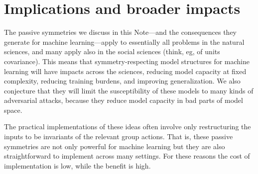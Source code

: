 \documentclass[11pt]{article}
\renewcommand{\paragraph}[1]{\medskip\par\noindent\textbf{#1}~---}
\begin{document}
\section{Implications and broader impacts}

The passive symmetries we discuss in this Note---and the consequences they generate for machine learning---apply to essentially all problems in the natural sciences, and many apply also in the social sciences (think, eg, of units covariance).
This means that symmetry-respecting model structures for machine learning will have impacts across the sciences, reducing model capacity at fixed complexity, reducing training burdens, and improving generalization.
We also conjecture that they will limit the susceptibility of these models to many kinds of adversarial attacks, because they reduce model capacity in bad parts of model space.

The practical implementations of these ideas often involve only restructuring the inputs to be invariants of the relevant group actions.
That is, these passive symmetries are not only powerful for machine learning but they are also straightforward to implement across many settings.
For these reasons the cost of implementation is low, while the benefit is high.



\raggedright

\end{document}
